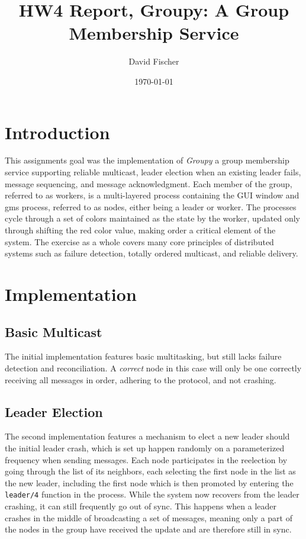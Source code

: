 \documentclass[a4paper, 11pt]{article}
\title{HW4 Report, Groupy: A Group Membership Service}
\author{David Fischer}
\date{\today{}}
\begin{document}
\maketitle

\section{Introduction}

This assignments goal was the implementation of \textit{Groupy} a group membership service supporting reliable multicast, leader election when an existing leader fails, message sequencing, and message acknowledgment.
Each member of the group, referred to as workers, is a multi-layered process containing the GUI window and gms process, referred to as nodes, either being a leader or worker. The processes cycle through a set of colors maintained as the state by the worker, updated only through shifting the red color value, making order a critical element of the system.
The exercise as a whole covers many core principles of distributed systems such as failure detection, totally ordered multicast, and reliable delivery.

\section{Implementation}

\subsection{Basic Multicast}

The initial implementation features basic multitasking, but still lacks failure detection and reconciliation. A \textit{correct} node in this case will only be one correctly receiving all messages in order, adhering to the protocol, and not crashing.


\subsection{Leader Election}

The second implementation features a mechanism to elect a new leader should the initial leader crash, which is set up happen randomly on a parameterized frequency when sending messages.
Each node participates in the reelection by going through the list of its neighbors, each selecting the first node in the list as the new leader, including the first node which is then promoted by entering the \texttt{leader/4} function in the process.
While the system now recovers from the leader crashing, it can still frequently go out of sync. This happens when a leader crashes in the middle of broadcasting a set of messages,
meaning only a part of the nodes in the group have received the update and are therefore still in sync.
\end{document}

